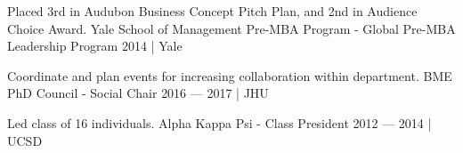 \begin{cventries}
    \cvpresentation
    {Placed 3rd in Audubon Business Concept Pitch Plan, and 2nd in Audience Choice Award.} %
    {Yale School of Management Pre-MBA Program - Global Pre-MBA Leadership Program} %
    {2014 | Yale} %
    {} %
    {\empty}
    {\empty}
    \vspace{-.9cm}
    
    \cvpresentation
    {Coordinate and plan events for increasing collaboration within department.} %
    {BME PhD Council - Social Chair} %
    {2016 --- 2017 | JHU} %
    {} %
    {\empty}
    {\empty}
    \vspace{-.9cm}

    \cvpresentation
    {Led class of 16 individuals.} %
    {Alpha Kappa Psi - Class President} %
    {2012 --- 2014 | UCSD} %
    {} %
    {\empty}
    {\empty}
    \vspace{-.9cm}
\end{cventries}
